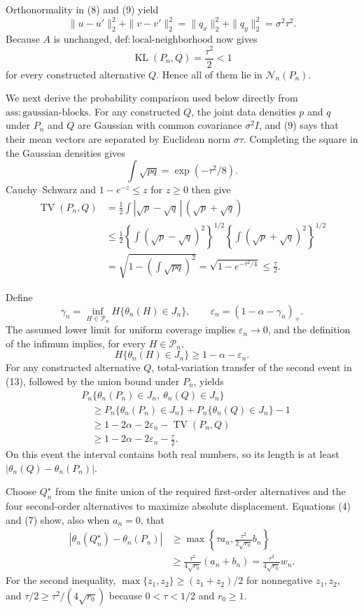 Orthonormality in (8) and (9) yield
\[
\|u-u'\|_2^2+\|v-v'\|_2^2
=\|q_x\|_2^2+\|q_y\|_2^2
=\sigma^2\tau^2.
\]
Because \(A\) is unchanged, \(\mathrm{def{:}local\mbox{-}neighborhood}\) now gives
\[
\operatorname{KL}(P_n,Q)=\frac{\tau^2}{2}<1 \tag{11}
\]
for every constructed alternative \(Q\).  Hence all of them lie in \(\mathcal N_n(P_n)\).

We next derive the probability comparison used below directly from \(\mathrm{ass{:}gaussian\mbox{-}blocks}\).  For any constructed \(Q\), the joint data densities \(p\) and \(q\) under \(P_n\) and \(Q\) are Gaussian with common covariance \(\sigma^2I\), and (9) says that their mean vectors are separated by Euclidean norm \(\sigma\tau\).  Completing the square in the Gaussian densities gives
\[
\int\sqrt{pq}=\exp(-\tau^2/8).
\]
Cauchy--Schwarz and \(1-e^{-z}\leq z\) for \(z\geq0\) then give
\[
\begin{aligned}
\operatorname{TV}(P_n,Q)
&=\frac12\int|\sqrt p-\sqrt q\,|\,(\sqrt p+\sqrt q)\\
&\leq\frac12
\left\{\int(\sqrt p-\sqrt q)^2\right\}^{1/2}
\left\{\int(\sqrt p+\sqrt q)^2\right\}^{1/2}\\
&=\sqrt{1-\left(\int\sqrt{pq}\right)^2}
=\sqrt{1-e^{-\tau^2/4}}
\leq\frac\tau2. 
\end{aligned} \tag{12}
\]

Define
\[
\gamma_n=\inf_{H\in\mathcal P_n}H\{\theta_n(H)\in J_n\},
\qquad
\varepsilon_n=(1-\alpha-\gamma_n)_+.
\]
The assumed lower limit for uniform coverage implies \(\varepsilon_n\to0\), and the definition of the infimum implies, for every \(H\in\mathcal P_n\),
\[
H\{\theta_n(H)\in J_n\}\geq1-\alpha-\varepsilon_n. \tag{13}
\]
For any constructed alternative \(Q\), total-variation transfer of the second event in (13), followed by the union bound under \(P_n\), yields
\[
\begin{aligned}
&P_n\{\theta_n(P_n)\in J_n,\ \theta_n(Q)\in J_n\}\\
&\quad\geq
P_n\{\theta_n(P_n)\in J_n\}
+P_n\{\theta_n(Q)\in J_n\}-1\\
&\quad\geq1-2\alpha-2\varepsilon_n-\operatorname{TV}(P_n,Q)\\
&\quad\geq1-2\alpha-2\varepsilon_n-\frac\tau2. 
\end{aligned} \tag{14}
\]
On this event the interval contains both real numbers, so its length is at least \(|\theta_n(Q)-\theta_n(P_n)|\).

Choose \(Q_n^\star\) from the finite union of the required first-order alternatives and the four second-order alternatives to maximize absolute displacement.  Equations (4) and (7) show, also when \(a_n=0\), that
\[
\begin{aligned}
|\theta_n(Q_n^\star)-\theta_n(P_n)|
&\geq\max\left\{\tau a_n,\frac{\tau^2}{2\sqrt{r_0}}b_n\right\}\\
&\geq\frac{\tau^2}{4\sqrt{r_0}}(a_n+b_n)
=\frac{\tau^2}{4\sqrt{r_0}}w_n. 
\end{aligned} \tag{15}
\]
For the second inequality, \(\max\{z_1,z_2\}\geq(z_1+z_2)/2\) for nonnegative \(z_1,z_2\), and \(\tau/2\geq\tau^2/(4\sqrt{r_0})\) because \(0<\tau<1/2\) and \(r_0\geq1\).


